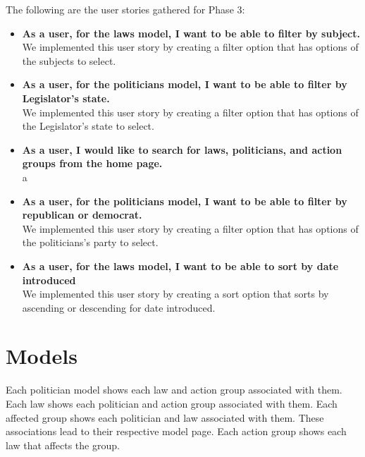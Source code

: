 \documentclass[12pt]{article}
\begin{document}
The following are the user stories gathered for Phase 3: \\
	
\begin{itemize}
	\item\textbf{As a user, for the laws model, I want to be able to filter by subject.} \\
	We implemented this user story by creating a filter option that has options of the subjects to select.
	\\
	\item\textbf{As a user, for the politicians model, I want to be able to filter by Legislator's state.} \\
	We implemented this user story by creating a filter option that has options of the Legislator's state to select.
	\\
	
	\item\textbf{As a user, I would like to search for laws, politicians, and action groups from the home page.} \\
	a
	\\
	
	\item\textbf{As a user, for the politicians model, I want to be able to filter by republican or democrat.} \\
	We implemented this user story by creating a filter option that has options of the politicians's party to select.
	\\
	
	\item\textbf{As a user, for the laws model, I want to be able to sort by date introduced} \\
	We implemented this user story by creating a sort option that sorts by ascending or descending for date introduced.
	\\
\end{itemize}

\section{Models}
    Each politician model shows each law and action group associated with them. Each law shows each politician and action group associated with them. Each affected group shows each politician and law associated with them. These associations lead to their respective model page. Each action group shows each law that affects the group. \\
\end{document}
